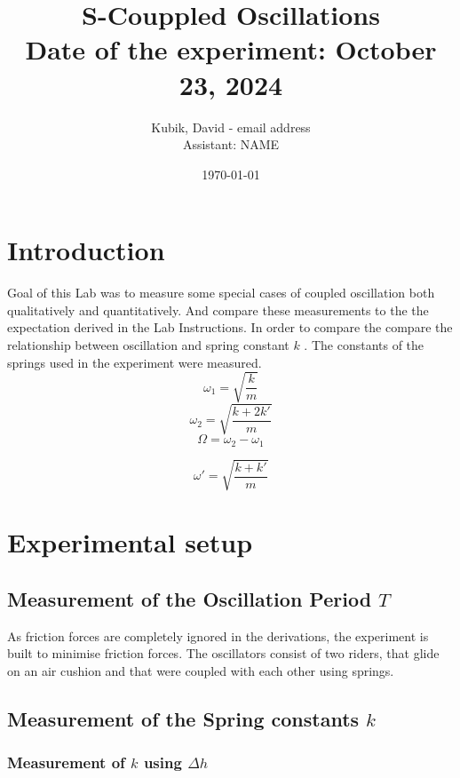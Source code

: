 \documentclass[11pt, a4paper]{article}
\title{\textbf{S-Couppled Oscillations} \\
	\normalsize{Date of the experiment: October 23, 2024}} %
\date{\today}  %
\author{\normalsize{Kubik, David - email address} \\ %
	    \normalsize{Assistant: NAME}} %
\begin{document}
\maketitle


\section{Introduction}

Goal of this Lab was to measure some special cases of coupled oscillation both qualitatively and quantitatively. And compare these measurements to the the expectation derived in the Lab Instructions. In order to compare the compare the relationship between oscillation and spring constant $k$ . The constants of the springs used in the experiment were measured.
\begin{equation}
\omega_1 = \sqrt{\frac{k}{m}}
\end{equation}
\begin{equation}
\omega_2 = \sqrt{\frac{k + 2k'}{m}}
\end{equation}
\begin{equation}
\Omega = \omega_2 - \omega_1
\end{equation}

\begin{equation}
\omega' = \sqrt{\frac{k + k'}{m}}
\end{equation}


\section{Experimental setup} \label{sec:ex}

\subsection{Measurement of the Oscillation Period $T$}
As friction forces are completely ignored in the derivations, the experiment is built
to minimise friction forces. The oscillators consist of two riders, that glide on an air cushion and
that were coupled with each other using springs.


\subsection{Measurement of the Spring constants $k$}
\subsubsection{Measurement of $k$ using $\Delta h$}
\end{document}
